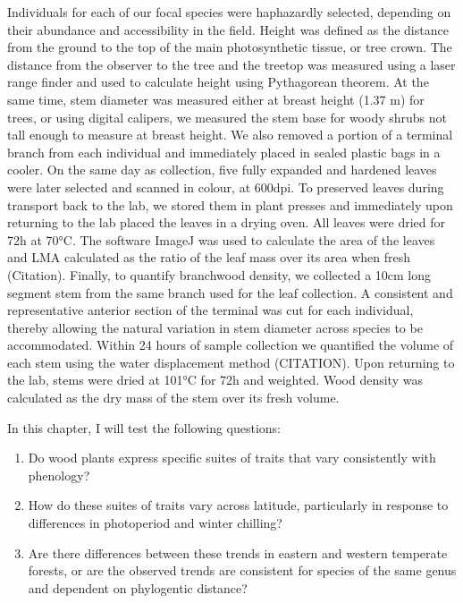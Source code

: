 \documentclass{article}\usepackage[]{graphicx}\usepackage[]{color}
\begin{document}
\par Individuals for each of our focal species were haphazardly selected, depending on their abundance and accessibility in the field. Height was defined as the distance from the ground to the top of the main photosynthetic tissue, or tree crown. The distance from the observer to the tree and the treetop was measured using a laser range finder and used to calculate height using Pythagorean theorem. At the same time, stem diameter was measured either at breast height (1.37 m) for trees, or using digital calipers, we measured the stem base for woody shrubs not tall enough to measure at breast height.  We also removed a portion of a terminal branch from each individual and immediately placed in sealed plastic bags in a cooler. On the same day as collection, five fully expanded and hardened leaves were later selected and scanned in colour, at 600dpi. To preserved leaves during transport back to the lab, we stored them in plant presses and immediately upon returning to the lab placed the leaves in a drying oven. All leaves were dried for 72h at 70°C. The software ImageJ was used to calculate the area of the leaves and LMA calculated as the ratio of the leaf mass over its area when fresh (Citation). Finally, to quantify branchwood density, we collected a 10cm long segment stem from the same branch used for the leaf collection. A consistent and representative anterior section of the terminal was cut for each individual, thereby allowing the natural variation in stem diameter across species to be accommodated. Within 24 hours of sample collection we quantified the volume of each stem using the water displacement method (CITATION). Upon returning to the lab, stems were dried at 101°C for 72h and weighted. Wood density was calculated as the dry mass of the stem over its fresh volume.  


\par In this chapter, I will test the following questions:
\begin{enumerate}
\item Do wood plants express specific suites of traits that vary consistently with phenology? 
\item How do these suites of traits vary across latitude, particularly in response to differences in photoperiod and winter chilling?
\item Are there differences between these trends in eastern and western temperate forests, or are the observed trends are consistent for species of the same genus and dependent on phylogentic distance?

\end{enumerate}
\par %
\end{document}
